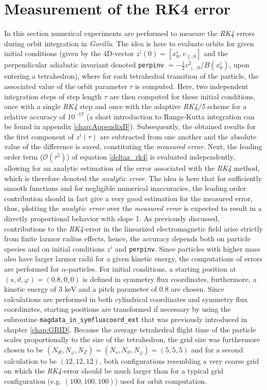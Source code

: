 \documentclass[./main.tex]{subfiles}
\begin{document}
\section{Measurement of the RK4 error}
In this section numerical experiments are performed to measure the \textit{RK4} errors during orbit integration in \textit{Gorilla}. The idea is here to evaluate orbits for given initial conditions (given by the 4D-vector $z^i(0)=[x^i_0,v_{\parallel,0}]$ and the perpendicular adiabatic invariant denoted \texttt{perpinv} $=-\frac{1}{2} v_{\perp,0}^2/B(x^i_0)$, upon entering a tetrahedron), where for each tetrahedral transition of the particle, the associated value of the orbit parameter $\tau$ is computed. Here, two  independent integration steps of step length $\tau$ are then computed for these initial conditions, once with a single \textit{RK4} step and once with the adaptive \textit{RK4/5} scheme for a relative accuracy of $10^{-17}$ (a short introduction to Runge-Kutta integration can be found in appendix \ref{chap:AppendixB}). Subsequently, the obtained results for the first component of $z^i(\tau)$ are subtracted from one another and the absolute value of the difference is saved, constituting the \textit{measured error}. Next, the leading order term ($\mathcal{O}(\tau^5)$) of equation \eqref{deltaz_rk4} is evaluated independently, allowing for an analytic estimation of the error associated with the \textit{RK4} method, which is therefore denoted the \textit{analytic error}. The idea is here that for sufficiently smooth functions and for negligible numerical inaccuracies, the leading order contribution should in fact give a very good estimation for the measured error, thus, plotting the \textit{analytic error} over the \textit{measured error} is expected to result in a directly proportional behavior with slope 1.
As previously discussed, contributions to the \textit{RK4}-error in the linearized electromagnetic field arise strictly from finite larmor radius effects, hence, the accuracy depends both on particle species and on initial conditions $z^i$ and \texttt{perpinv}. Since particles with higher mass also have larger larmor radii for a given kinetic energy, the computations of  errors are performed for $\alpha$-particles. For initial conditions, a starting position at $(s,\vartheta,\varphi) = (0.8,0,0)$ is defined in symmetry flux coordinates, furthermore, a kinetic energy of 3 \textrm{keV} and a pitch parameter of 0.8 are chosen. Since calculations are performed in both cylindrical coordinates and symmetry flux coordinates, starting positions are transformed if necessary by using the subroutine \texttt{magdata\_in\_symfluxcoord\_ext} that was previously introduced in chapter \autoref{chap:GRID}. Because the average tetrahedral flight time of the particle scales proportionally to the size of the tetrahedron, the grid size was furthermore chosen to be $(N_R,N_\varphi,N_Z) = (N_s,N_\vartheta,N_\varphi)=(5,5,5)$ and for a second calculation to be $(12,12,12)$, both configurations resembling a very coarse grid on which the \textit{RK4}-error should be much larger than for a typical grid configuration (e.g. $(100,100,100)$) used for orbit computation.
\end{document}
